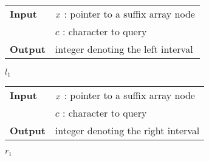 \begin{figure*}
\begin{minipage}[t]{.5\textwidth}
\begin{algorithm}[H]
\begin{tabular}{ll}
\textbf{Input}  & $x$ : pointer to a suffix array node\\
				& $c$ : character to query\\
\textbf{Output} & integer denoting the left interval\\
\end{tabular}
\begin{algorithmic}[1]
	\Else
	\EndIf
\EndWhile
\State \Return $l_1$
\end{algorithmic}
\label{alg:sa-lower}
\end{algorithm}
\end{minipage}
\hfill
\begin{minipage}[t]{.5\textwidth}
\begin{algorithm}[H]
\begin{tabular}{ll}
\textbf{Input}  & $x$ : pointer to a suffix array node\\
				& $c$ : character to query\\
\textbf{Output} & integer denoting the right interval\\
\end{tabular}
\begin{algorithmic}[1]
	\Else
	\EndIf
\EndWhile
\State \Return $r_1$
\end{algorithmic}
\label{alg:sa-upper}
\end{algorithm}
\end{minipage}
\end{figure*}


